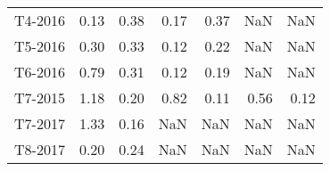 \begin{tabular}{lrrrrrr}
     T4-2016 &                   0.13 &                0.38 &                   0.17 &                0.37 &                    NaN &                 NaN \\
     T5-2016 &                   0.30 &                0.33 &                   0.12 &                0.22 &                    NaN &                 NaN \\
     T6-2016 &                   0.79 &                0.31 &                   0.12 &                0.19 &                    NaN &                 NaN \\
     T7-2015 &                   1.18 &                0.20 &                   0.82 &                0.11 &                   0.56 &                0.12 \\
     T7-2017 &                   1.33 &                0.16 &                    NaN &                 NaN &                    NaN &                 NaN \\
     T8-2017 &                   0.20 &                0.24 &                    NaN &                 NaN &                    NaN &                 NaN \\
\bottomrule
\end{tabular}
